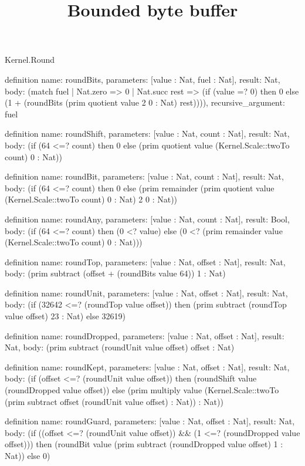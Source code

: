 \begin{lexlean}{Kernel.Round}
\title{Bounded byte buffer}
\begin{semanticmodule}
definition{
  name: roundBits,
  parameters: [value : Nat, fuel : Nat],
  result: Nat,
  body: (match fuel
    | Nat.zero => 0
    | Nat.succ rest => (if (value =? 0) then 0 else (1 + (roundBits (prim quotient value 2 0 : Nat) rest)))),
  recursive_argument: fuel
}

definition{
  name: roundShift,
  parameters: [value : Nat, count : Nat],
  result: Nat,
  body: (if (64 <=? count) then 0 else (prim quotient value (Kernel.Scale::twoTo count) 0 : Nat))
}

definition{
  name: roundBit,
  parameters: [value : Nat, count : Nat],
  result: Nat,
  body: (if (64 <=? count) then 0 else (prim remainder (prim quotient value (Kernel.Scale::twoTo count) 0 : Nat) 2 0 : Nat))
}

definition{
  name: roundAny,
  parameters: [value : Nat, count : Nat],
  result: Bool,
  body: (if (64 <=? count) then (0 <? value) else (0 <? (prim remainder value (Kernel.Scale::twoTo count) 0 : Nat)))
}

definition{
  name: roundTop,
  parameters: [value : Nat, offset : Nat],
  result: Nat,
  body: (prim subtract (offset + (roundBits value 64)) 1 : Nat)
}

definition{
  name: roundUnit,
  parameters: [value : Nat, offset : Nat],
  result: Nat,
  body: (if (32642 <=? (roundTop value offset)) then (prim subtract (roundTop value offset) 23 : Nat) else 32619)
}

definition{
  name: roundDropped,
  parameters: [value : Nat, offset : Nat],
  result: Nat,
  body: (prim subtract (roundUnit value offset) offset : Nat)
}

definition{
  name: roundKept,
  parameters: [value : Nat, offset : Nat],
  result: Nat,
  body: (if (offset <=? (roundUnit value offset)) then (roundShift value (roundDropped value offset)) else (prim multiply value (Kernel.Scale::twoTo (prim subtract offset (roundUnit value offset) : Nat)) : Nat))
}

definition{
  name: roundGuard,
  parameters: [value : Nat, offset : Nat],
  result: Nat,
  body: (if ((offset <=? (roundUnit value offset)) && (1 <=? (roundDropped value offset))) then (roundBit value (prim subtract (roundDropped value offset) 1 : Nat)) else 0)
}


\end{semanticmodule}
\end{lexlean}
